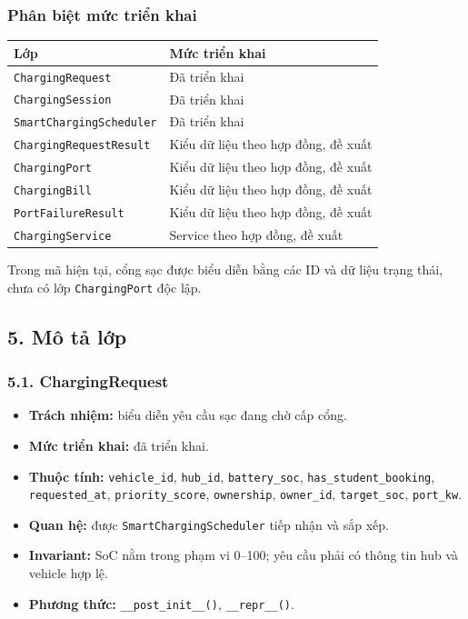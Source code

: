 \documentclass[11pt,a4paper]{article}
\providecommand{\tightlist}{%
  \setlength{\itemsep}{0pt}\setlength{\parskip}{0pt}}
\begin{document}
\hypertarget{phuxe2n-biux1ec7t-mux1ee9c-triux1ec3n-khai}{%
\subsubsection{Phân biệt mức triển
khai}\label{phuxe2n-biux1ec7t-mux1ee9c-triux1ec3n-khai}}

\begin{longtable}[]{@{}ll@{}}
\toprule\noalign{}
Lớp & Mức triển khai \\
\midrule\noalign{}
\endhead
\bottomrule\noalign{}
\endlastfoot
\texttt{ChargingRequest} & Đã triển khai \\
\texttt{ChargingSession} & Đã triển khai \\
\texttt{SmartChargingScheduler} & Đã triển khai \\
\texttt{ChargingRequestResult} & Kiểu dữ liệu theo hợp đồng, đề xuất \\
\texttt{ChargingPort} & Kiểu dữ liệu theo hợp đồng, đề xuất \\
\texttt{ChargingBill} & Kiểu dữ liệu theo hợp đồng, đề xuất \\
\texttt{PortFailureResult} & Kiểu dữ liệu theo hợp đồng, đề xuất \\
\texttt{ChargingService} & Service theo hợp đồng, đề xuất \\
\end{longtable}

Trong mã hiện tại, cổng sạc được biểu diễn bằng các ID và dữ liệu trạng
thái, chưa có lớp \texttt{ChargingPort} độc lập.

\hypertarget{muxf4-tux1ea3-lux1edbp}{%
\subsection{5. Mô tả lớp}\label{muxf4-tux1ea3-lux1edbp}}

\hypertarget{chargingrequest}{%
\subsubsection{5.1. ChargingRequest}\label{chargingrequest}}

\begin{itemize}
\tightlist
\item
  \textbf{Trách nhiệm:} biểu diễn yêu cầu sạc đang chờ cấp cổng.
\item
  \textbf{Mức triển khai:} đã triển khai.
\item
  \textbf{Thuộc tính:} \texttt{vehicle\_id}, \texttt{hub\_id},
  \texttt{battery\_soc}, \texttt{has\_student\_booking},
  \texttt{requested\_at}, \texttt{priority\_score}, \texttt{ownership},
  \texttt{owner\_id}, \texttt{target\_soc}, \texttt{port\_kw}.
\item
  \textbf{Quan hệ:} được \texttt{SmartChargingScheduler} tiếp nhận và
  sắp xếp.
\item
  \textbf{Invariant:} SoC nằm trong phạm vi 0--100; yêu cầu phải có
  thông tin hub và vehicle hợp lệ.
\item
  \textbf{Phương thức:} \texttt{\_\_post\_init\_\_()},
  \texttt{\_\_repr\_\_()}.
\end{itemize}
\end{document}
